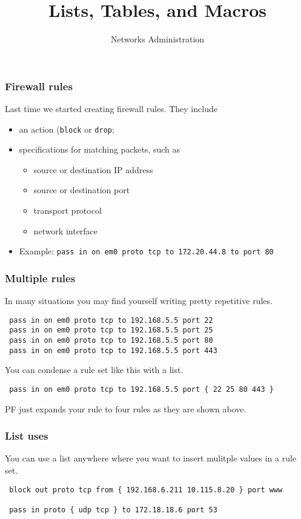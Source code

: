 \documentclass[10pt]{beamer}
\title{Lists, Tables, and  Macros}
\author[IN715]{Networks Administration}
\institute[Otago Polytechnic]{
  Otago Polytechnic \\
  Dunedin, New Zealand \\
}
\date{}
\begin{document}
\begin{frame}[plain]
  \titlepage
\end{frame}


\begin{frame}
  \frametitle{Firewall rules}
 Last time we started creating firewall rules. They include
 \begin{itemize}
    \item an action (\texttt{block} or \texttt{drop};
    \item specifications for matching packets, such as
        \begin{itemize}
             \item source or destination IP address
             \item source or destination port
             \item transport protocol
             \item network interface
        \end{itemize}
    \item Example: \texttt{pass in on em0 proto tcp to 172.20.44.8 to port 80} 
 \end{itemize}

\end{frame}


\begin{frame}[fragile]
  \frametitle{Multiple rules}

 In many situations you may find yourself writing pretty repetitive rules.

 \begin{verbatim}
 pass in on em0 proto tcp to 192.168.5.5 port 22    
 pass in on em0 proto tcp to 192.168.5.5 port 25    
 pass in on em0 proto tcp to 192.168.5.5 port 80    
 pass in on em0 proto tcp to 192.168.5.5 port 443   
 \end{verbatim}
 
 You can condense a rule set like this with a list.
 \begin{verbatim}
 pass in on em0 proto tcp to 192.168.5.5 port { 22 25 80 443 }   
 \end{verbatim}
 PF just expands your rule to four rules as they are shown above.
\end{frame}



\begin{frame}[fragile]
  \frametitle{List uses}

 You can use a list anywhere where you want to insert mulitple values in a 
 rule set.

 \begin{verbatim}
 block out proto tcp from { 192.168.6.211 10.115.8.20 } port www

 pass in proto { udp tcp } to 172.18.18.6 port 53   
 \end{verbatim}

\end{frame}
\end{document}
